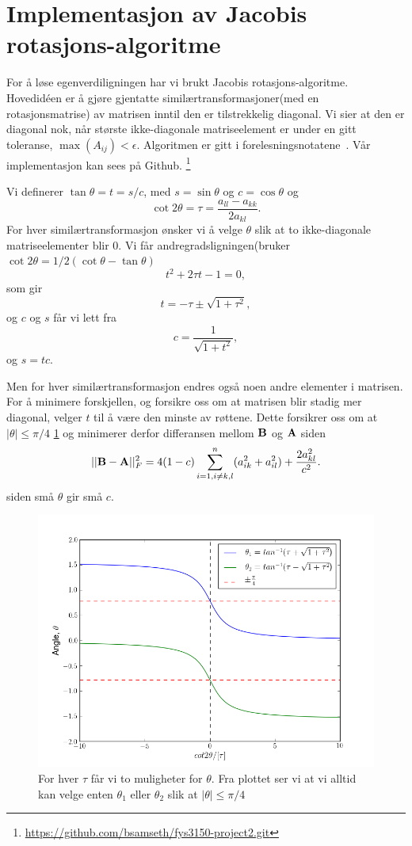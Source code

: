 \documentclass[11pt]{article}
\begin{document}
\section{Implementasjon av Jacobis rotasjons-algoritme}
For å løse egenverdiligningen har vi brukt Jacobis rotasjons-algoritme. 
Hovedidéen er å gjøre gjentatte similærtransformasjoner(med en rotasjonsmatrise) av 
matrisen inntil den er tilstrekkelig diagonal. Vi sier at den er diagonal nok, når største 
ikke-diagonale matriseelement er under en gitt toleranse,  $ \max(A_{ij}) < \epsilon$. Algoritmen er gitt
i forelesningsnotatene~\cite[seksjon 7.4, side 215]{Lecture-notes}. Vår implementasjon kan sees på Github. \footnote{\url{https://github.com/bsamseth/fys3150-project2.git}}


Vi definerer $\tan\theta = t= s/c$, med $s=\sin\theta$ og $c=\cos\theta$ og
\[\cot 2\theta=\tau = \frac{a_{ll}-a_{kk}}{2a_{kl}}.
\]
For hver similærtransformasjon ønsker vi å velge $\theta$ slik at to ikke-diagonale matriseelementer blir 0. 
 Vi får andregradsligningen(bruker $\cot 2\theta=1/2(\cot \theta-\tan\theta)$
\[
t^2+2\tau t-1= 0,
\]
som gir 
\[
  t = -\tau \pm \sqrt{1+\tau^2},
\]
og $c$ og $s$ får vi lett fra
\[
   c = \frac{1}{\sqrt{1+t^2}},
\]
og $s=tc$. 

Men for hver similærtransformasjon endres også noen andre elementer i matrisen. For 
å minimere forskjellen, og forsikre oss om at matrisen blir stadig mer diagonal, 
velger $t$ til å være den minste av røttene. Dette forsikrer oss om at $|\theta| \le \pi/4$ \ref{fig:theta} og minimerer derfor differansen mellom ${\bf B}$ og ${\bf A}$ siden
\[
||{\bf B}-{\bf A}||_F^2=4(1-c)\sum_{i=1,i\ne k,l}^n(a_{ik}^2+a_{il}^2) +\frac{2a_{kl}^2}{c^2}.
\]
siden små $\theta$ gir små $c$.

\begin{figure}[ht]
  \centering
  \includegraphics[scale=0.7]{fig/theta.png}
  \caption{\label{fig:theta} For hver $\tau$ får vi to muligheter for $\theta$. Fra plottet ser vi at vi alltid kan velge enten $\theta_1$ eller $\theta_2$ slik at $|\theta| \le \pi/4$ }
\end{figure}
\end{document}

